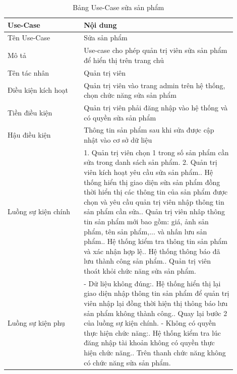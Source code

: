 \begin{longtable}[htp]{ |m{0.3\linewidth}|m{0.6\linewidth}|}
 \caption{Bảng Use-Case sửa sản phẩm \label{updateProduct}}\\
 \hline
 Use-Case & Nội dung \\
 \hline
 Tên Use-Case & Sửa sản phẩm \\
 \hline
 Mô tả & Use-case cho phép quản trị viên sửa sản phẩm để hiển thị trên trang chủ\\
 \hline
 Tên tác nhân & Quản trị viên\\
 \hline
 Điều kiện kích hoạt & Quản trị viên vào trang admin trên hệ thống, chọn chức năng sửa sản phẩm\\
 \hline
 Tiền điều kiện & Quản trị viên phải đăng nhập vào hệ thống và có quyền sửa sản phẩm\\
 \hline
 Hậu điều kiện & Thông tin sản phẩm sau khi sửa được cập nhật vào cơ sở dữ liệu\\
 \hline
 Luồng sự kiện chính & 
 1. Quản trị viên chọn 1 trong số sản phẩm cần sửa trong danh sách sản phẩm.
 2. Quản trị viên kích hoạt yêu cầu sửa sản phẩm.\newline
 3. Hệ thống hiển thị giao diện sửa sản phẩm đồng thời hiển thị các thông tin của sản phẩm được chọn và yêu cầu quản trị viên nhập thông tin sản phẩm cần sửa.\newline
 4. Quản trị viên nhâp thông tin sản phẩm mới bao gồm: giá, ảnh sản phẩm, tên sản phẩm,... và nhấn lưu sản phẩm.\newline
 5. Hệ thống kiểm tra thông tin sản phẩm và xác nhận hợp lệ.\newline
 6. Hệ thống thông báo đã lưu thành công sản phẩm.\newline	
 7. Quản trị viên thoát khỏi chức năng sửa sản phẩm.
 \\
 \hline
 Luồng sự kiện phụ & 
 - Dữ liệu không đúng:\newline
  1. Hệ thống hiển thị lại giao diện nhập thông tin sản phẩm để quản trị viên nhập lại đồng thời hiện thị thông báo lưu sản phẩm không thành công.\newline
  2. Quay lại bước 2 của luồng sự kiện chính.\newline
  - Không có quyền thực hiện chức năng:\newline
  1. Hệ thống kiểm tra lúc đăng nhập tài khoản không có quyền thực hiện chức năng.\newline
  2. Trên thanh chức năng không có chức năng sửa sản phẩm.
 \\
 \hline
\end{longtable}

